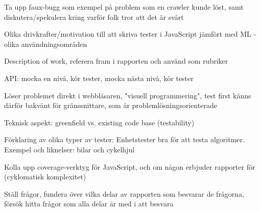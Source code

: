 \documentclass[11pt]{article}
\begin{document}
Ta upp faux-bugg som exempel på problem som en crawler kunde löst, samt diskutera/spekulera kring varför folk tror att det är svårt

Olika drivkrafter/motivation till att skriva tester i JavaScript jämfört med ML - olika användningsområden

Description of work, referera fram i rapporten och använd som rubriker

API: mocka en nivå, kör tester, mocka nästa nivå, kör tester

Löser problemet direkt i webbläsaren, "visuell programmering", test first känns därför bakvänt för gränssnittare, som är problemlösningsorienterade

Teknisk aspekt: greenfield vs. existing code base (testability)

Förklaring av olika typer av tester: Enhetstester bra för att testa algoritmer. Exempel och liknelser: bilar och cykelhjul

Kolla upp coverage-verktyg för JavaScript, och om någon erbjuder rapporter för (cyklomatisk komplexitet)

Ställ frågor, fundera över vilka delar av rapporten som besvarar de frågorna, försök hitta frågor som alla delar är med i att besvara

\printbibliography
\end{document}
